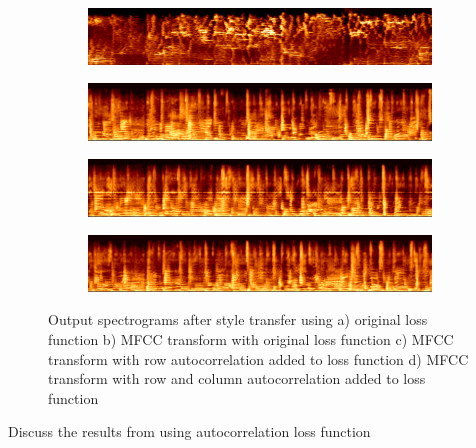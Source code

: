 \documentclass{article}
\begin{document}
\begin{figure}[!h]
\begin{subfigure}{\textwidth}
  \centering
  \includegraphics[width = \textwidth]{out1_spec}
  \caption{}
\end{subfigure}
\begin{subfigure}{\textwidth}
  \centering
  \includegraphics[width = \textwidth]{out2_spec}
  \caption{}
\end{subfigure}
\begin{subfigure}{\textwidth}
  \centering
  \includegraphics[width = \textwidth]{out3_spec}
  \caption{}
\end{subfigure}
\begin{subfigure}{\textwidth}
  \centering
  \includegraphics[width = \textwidth]{out4_spec}
  \caption{}
\end{subfigure}
\caption{Output spectrograms after style transfer using a) original loss function b) MFCC transform with original loss function c) MFCC transform with row autocorrelation added to loss function d) MFCC transform with row and column autocorrelation added to loss function}
\end{figure}

Discuss the results from using autocorrelation loss function
\end{document}
